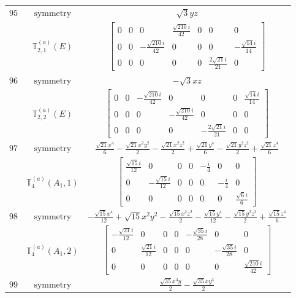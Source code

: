 \documentclass[fleqn,8pt,landscape]{jsarticle}
\begin{document}
\begin{longtable}{ccc}
$ 95 $ & $ \text{symmetry} $ & $ \sqrt{3} y z $ \\
$  $ & $ \mathbb{T}_{2,1}^{(a)}(E) $ & $ \begin{bmatrix} 0 & 0 & 0 & \frac{\sqrt{210} i}{42} & 0 & 0 & 0 \\ 0 & 0 & - \frac{\sqrt{210} i}{42} & 0 & 0 & 0 & - \frac{\sqrt{14} i}{14} \\ 0 & 0 & 0 & 0 & 0 & \frac{2 \sqrt{21} i}{21} & 0 \end{bmatrix} $ \\ \hline
$ 96 $ & $ \text{symmetry} $ & $ - \sqrt{3} x z $ \\
$  $ & $ \mathbb{T}_{2,2}^{(a)}(E) $ & $ \begin{bmatrix} 0 & 0 & - \frac{\sqrt{210} i}{42} & 0 & 0 & 0 & \frac{\sqrt{14} i}{14} \\ 0 & 0 & 0 & - \frac{\sqrt{210} i}{42} & 0 & 0 & 0 \\ 0 & 0 & 0 & 0 & - \frac{2 \sqrt{21} i}{21} & 0 & 0 \end{bmatrix} $ \\ \hline
$ 97 $ & $ \text{symmetry} $ & $ \frac{\sqrt{21} x^{4}}{6} - \frac{\sqrt{21} x^{2} y^{2}}{2} - \frac{\sqrt{21} x^{2} z^{2}}{2} + \frac{\sqrt{21} y^{4}}{6} - \frac{\sqrt{21} y^{2} z^{2}}{2} + \frac{\sqrt{21} z^{4}}{6} $ \\
$  $ & $ \mathbb{T}_{4}^{(a)}(A_{1},1) $ & $ \begin{bmatrix} \frac{\sqrt{15} i}{12} & 0 & 0 & 0 & - \frac{i}{4} & 0 & 0 \\ 0 & - \frac{\sqrt{15} i}{12} & 0 & 0 & 0 & - \frac{i}{4} & 0 \\ 0 & 0 & 0 & 0 & 0 & 0 & \frac{\sqrt{6} i}{6} \end{bmatrix} $ \\ \hline
$ 98 $ & $ \text{symmetry} $ & $ - \frac{\sqrt{15} x^{4}}{12} + \sqrt{15} x^{2} y^{2} - \frac{\sqrt{15} x^{2} z^{2}}{2} - \frac{\sqrt{15} y^{4}}{12} - \frac{\sqrt{15} y^{2} z^{2}}{2} + \frac{\sqrt{15} z^{4}}{6} $ \\
$  $ & $ \mathbb{T}_{4}^{(a)}(A_{1},2) $ & $ \begin{bmatrix} - \frac{\sqrt{21} i}{12} & 0 & 0 & 0 & - \frac{\sqrt{35} i}{28} & 0 & 0 \\ 0 & \frac{\sqrt{21} i}{12} & 0 & 0 & 0 & - \frac{\sqrt{35} i}{28} & 0 \\ 0 & 0 & 0 & 0 & 0 & 0 & \frac{\sqrt{210} i}{42} \end{bmatrix} $ \\ \hline
$ 99 $ & $ \text{symmetry} $ & $ \frac{\sqrt{35} x^{3} y}{2} - \frac{\sqrt{35} x y^{3}}{2} $ \\

\end{longtable}
\end{document}

